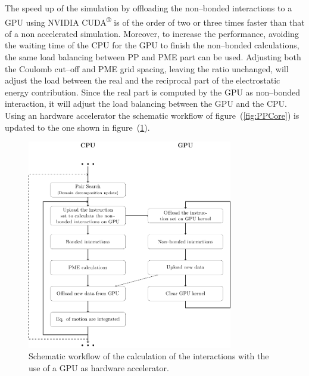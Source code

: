 The speed up of the simulation by offloading the non--bonded interactions to a GPU using NVIDIA 
CUDA\textsuperscript{®} is of the order of two or three times faster than that of a non accelerated simulation. 
Moreover, to increase the performance, avoiding the waiting time of the CPU for the GPU to finish the non--bonded 
calculations, the same load balancing between \ac{PP} and \ac{PME} part can be used. Adjusting both the Coulomb 
cut--off and \ac{PME} grid spacing, leaving the ratio unchanged, will adjust the load between the real and the 
reciprocal part of the electrostatic energy contribution. Since the real part is computed by the GPU as 
non--bonded interaction, it will adjust the load balancing between the GPU and the CPU. Using an hardware 
accelerator the schematic workflow of figure~(\ref{fig:PPCore}) is updated to the one shown in 
figure~(\ref{fig:GPU}).
\begin{figure}[h!t]
	\centering
	\includegraphics[width=0.8\textwidth]{./img/Schemi/GPU}
	\caption{Schematic workflow of the calculation of the interactions with the use of a GPU as hardware accelerator.}
	\label{fig:GPU}
\end{figure}

